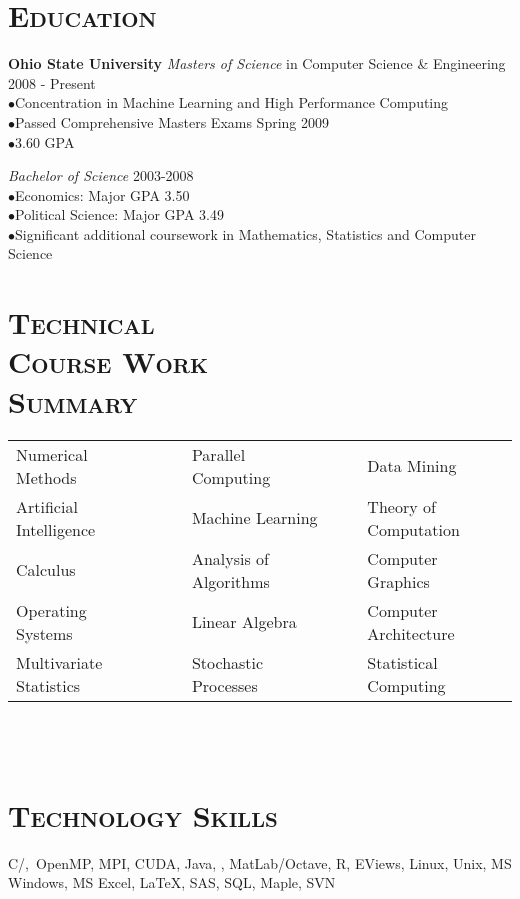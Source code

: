 \begin{resume}

\section{\textsc{Education}}

\textbf{Ohio State University}
\newline
\textit{Masters of Science} in Computer Science \& Engineering \hfill 2008 - Present \\
$\bullet$Concentration in Machine Learning and High Performance Computing\\
$\bullet$Passed Comprehensive Masters Exams Spring 2009 \\
$\bullet$3.60 GPA

\textit{Bachelor of Science} \hfill 2003-2008 \\
$\bullet$Economics: Major GPA 3.50\\
$\bullet$Political Science: Major GPA 3.49 \\
$\bullet$Significant additional coursework in Mathematics, Statistics and Computer Science

\section{\textsc{Technical \\  Course Work \\ Summary}}


\begin{tabular}{lllll}
Numerical Methods      & \ \ & Parallel Computing      & \ \ & Data Mining  \\
Artificial Intelligence   & \ \ & Machine Learning    & \ \ & Theory of Computation \\ 
Calculus     & \ \ & Analysis of Algorithms          & \ \ &  Computer Graphics    \\
Operating Systems      & \ \ & Linear Algebra           & \ \ & Computer Architecture \\
Multivariate Statistics      & \ \ & Stochastic Processes           & \ \ & Statistical Computing  \\
\end{tabular}

\begin{formatb}
  \\
  \body\\
\end{formatb}

\section{\textsc{Technology Skills}}
C/\Cplusplus,\ OpenMP, MPI, CUDA, Java, \CSharp, MatLab/Octave, R, EViews, Linux, Unix, MS Windows, MS Excel, \LaTeX, SAS, SQL, Maple, SVN


\end{resume}
